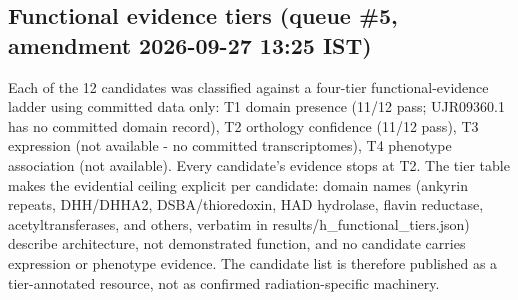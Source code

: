 \documentclass[12pt,a4paper]{article}
\begin{document}
\subsection{Functional evidence tiers (queue \#5, amendment 2026-09-27 13:25 IST)}
Each of the 12 candidates was classified against a four-tier functional-evidence ladder using committed data only: T1 domain presence (11/12 pass; UJR09360.1 has no committed domain record), T2 orthology confidence (11/12 pass), T3 expression (not available - no committed transcriptomes), T4 phenotype association (not available). Every candidate's evidence stops at T2. The tier table makes the evidential ceiling explicit per candidate: domain names (ankyrin repeats, DHH/DHHA2, DSBA/thioredoxin, HAD hydrolase, flavin reductase, acetyltransferases, and others, verbatim in results/h\_functional\_tiers.json) describe architecture, not demonstrated function, and no candidate carries expression or phenotype evidence. The candidate list is therefore published as a tier-annotated resource, not as confirmed radiation-specific machinery.
\end{document}
